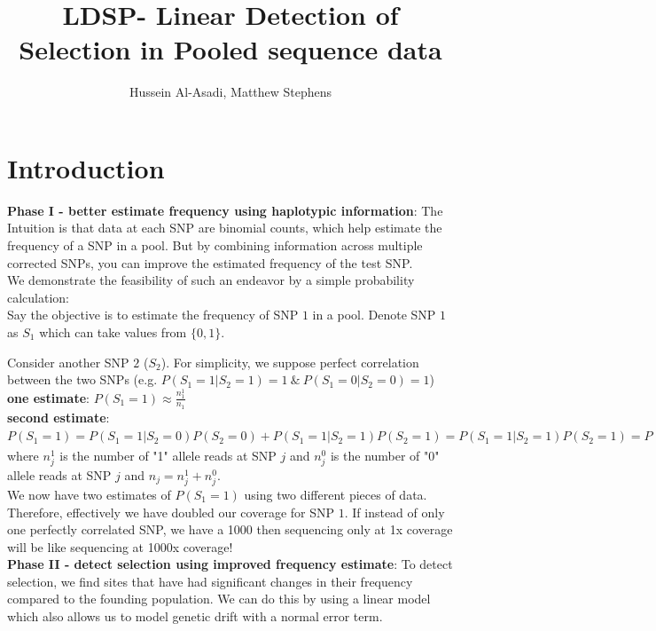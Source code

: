 \documentclass[10pt,a4paper,draft]{article}
\title{LDSP- Linear Detection of Selection in Pooled sequence data}
\date{}
\author{Hussein Al-Asadi, Matthew Stephens}
\begin{document}
\maketitle
\section{Introduction}
\textbf{Phase I - better estimate frequency using haplotypic information}:
The Intuition is that data at each SNP are binomial counts, which help estimate the frequency of a SNP in a pool. But by combining information across multiple corrected SNPs, you can improve the estimated frequency of the test SNP. \\

We demonstrate the feasibility of such an endeavor by a simple probability calculation:\\

Say the objective is to estimate the frequency of SNP $1$ in a  pool. Denote SNP $1$ as $S_1$ which can take values from $\{0,1\}$.

Consider another SNP $2$ ($S_2$). For simplicity, we suppose perfect correlation between the two SNPs (e.g. $P(S_1 = 1 | S_2 = 1) = 1 \ \& \ P(S_1 = 0 | S_2 = 0) = 1$) \\

\textbf{one estimate}: $P(S_1 = 1) \approx \frac{n_1^1}{n_1}$ \\
\textbf{second estimate}:  $P(S_1 = 1) = P(S_1 = 1 | S_2 = 0)P(S_2=0) + P(S_1 = 1 | S_2 = 1)P(S_2=1) = P(S_1 = 1 | S_2 = 1)P(S_2 = 1) = P(S_2 = 1) \approx \frac{n_2^1}{n_2}$ \\

where $n_j^1$ is the number of "1" allele reads at SNP $j$ and $n_j^0$ is the number of "0" allele reads at SNP $j$ and $n_j = n_j^1 + n_j^0$. \\

We now have two estimates of $P(S_1=1)$ using two different pieces of data. Therefore, effectively we have doubled our coverage for SNP $1$. If instead of only one perfectly correlated SNP, we have a 1000 then sequencing only at 1x coverage will be like sequencing at 1000x coverage! \\

\textbf{Phase II - detect selection using improved frequency estimate}:
To detect selection, we find sites that have had significant changes in their frequency compared to the founding population. We can do this by using a linear model which also allows us to model genetic drift with a normal error term.
\end{document}
